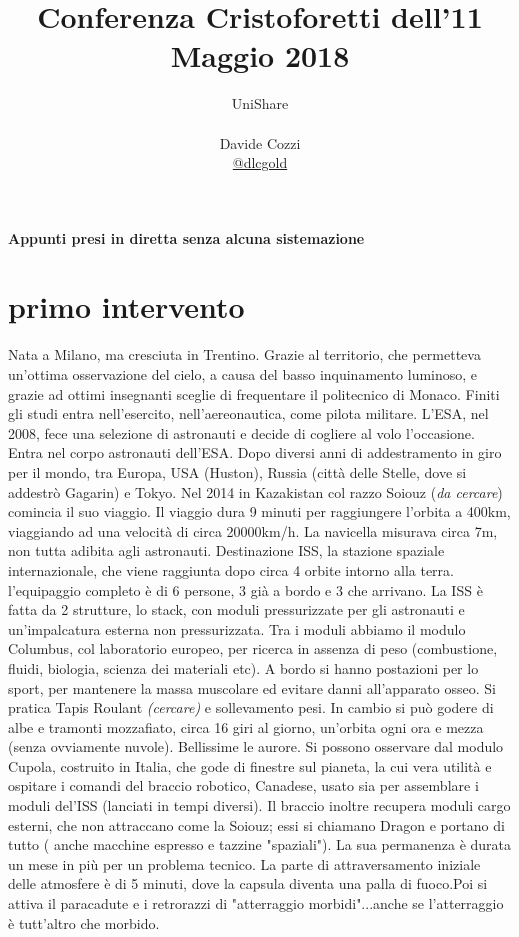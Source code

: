 \documentclass[a4paper,12pt, oneside]{book}
\title{Conferenza Cristoforetti dell'11 Maggio 2018}
\author{UniShare\\\\Davide Cozzi\\\href{https://t.me/dlcgold}{@dlcgold}}
\date{}
\begin{document}
\maketitle


\newtheorem{teorema}{Teorema}
\newtheorem{definizione}{Definizione}
\newtheorem{esempio}{Esempio}
\newtheorem{corollario}{Corollario}
\newtheorem{lemma}{Lemma}
\newtheorem{osservazione}{Osservazione}
\newtheorem{nota}{Nota}
\newtheorem{esercizio}{Esercizio}
\newtheorem{domanda}{Domanda}
\renewcommand{\chaptermark}[1]{%
\markboth{\chaptername
\ \thechapter.\ #1}{}}
\renewcommand{\sectionmark}[1]{\markright{\thesection.\ #1}}
\textbf{Appunti presi in diretta senza alcuna sistemazione}
\section{primo intervento}
Nata a Milano, ma cresciuta in Trentino. Grazie al territorio, che permetteva un'ottima osservazione del cielo, a causa del basso inquinamento luminoso, e grazie ad ottimi insegnanti sceglie di frequentare il politecnico di Monaco. Finiti gli studi entra nell'esercito, nell'aereonautica, come pilota militare. L'ESA, nel 2008, fece una selezione di astronauti e decide di cogliere al volo l'occasione. Entra nel corpo astronauti dell'ESA. Dopo diversi anni di addestramento in giro per il mondo, tra Europa, USA (Huston), Russia (città delle Stelle, dove si addestrò Gagarin) e Tokyo. Nel 2014 in Kazakistan col razzo Soiouz (\textit{da cercare}) comincia il suo viaggio. Il viaggio dura 9 minuti per raggiungere l'orbita a 400km, viaggiando ad una velocità di circa 20000km/h. La navicella misurava circa 7m, non tutta adibita agli astronauti. Destinazione ISS, la stazione spaziale internazionale, che viene raggiunta dopo circa 4 orbite intorno alla terra. l'equipaggio completo è di 6 persone, 3 già a bordo e 3 che arrivano. La ISS è fatta da 2 strutture, lo stack, con moduli pressurizzate per gli astronauti e un'impalcatura esterna non pressurizzata. Tra i moduli abbiamo il modulo Columbus, col laboratorio europeo, per ricerca in assenza di peso (combustione, fluidi, biologia, scienza dei materiali etc). A bordo si hanno postazioni per lo sport, per mantenere la massa muscolare ed evitare danni all'apparato osseo. Si pratica Tapis Roulant \textit{(cercare)} e sollevamento pesi. In cambio si può godere di albe e tramonti mozzafiato, circa 16 giri al giorno, un'orbita ogni ora e mezza (senza ovviamente nuvole). Bellissime le aurore. Si possono osservare dal modulo Cupola, costruito in Italia, che gode di finestre sul pianeta, la cui vera utilità e ospitare i comandi del braccio robotico, Canadese, usato sia per assemblare i moduli del'ISS (lanciati in tempi diversi). 
 Il braccio inoltre recupera moduli cargo esterni, che non attraccano come la Soiouz; essi si chiamano Dragon e portano di tutto ( anche macchine espresso e tazzine "spaziali"). La sua permanenza è durata un mese in più per un problema tecnico. La parte di attraversamento iniziale delle atmosfere è di 5 minuti, dove la capsula diventa una palla di fuoco.Poi si attiva il paracadute e i retrorazzi di "atterraggio morbidi"...anche se l'atterraggio è tutt'altro che morbido.
 \newpage
\end{document}
